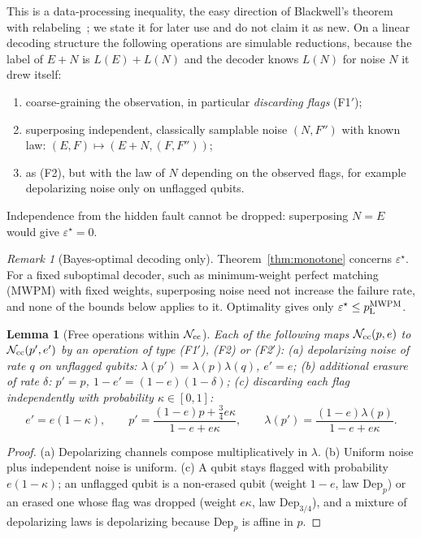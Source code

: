 \documentclass[11pt,a4paper]{article}
\theoremstyle{plain}
\newtheorem{lemma}[theorem]{Lemma}
\theoremstyle{definition}
\theoremstyle{remark}
\newtheorem{remark}[theorem]{Remark}
\newcommand{\err}{\varepsilon^{\star}}
\newcommand{\pL}{p_{\mathrm{L}}}
\newcommand{\Dep}{\mathrm{Dep}}
\newcommand{\Ncc}{\mathcal{N}_{\rm cc}}
\begin{document}
\noindent This is a data-processing inequality, the easy direction of Blackwell's theorem with relabeling~\cite{Blackwell}; we state it for later use and do not claim it as new. On a linear decoding structure the following operations are simulable reductions, because the label of $E+N$ is $L(E)+L(N)$ and the decoder knows $L(N)$ for noise $N$ it drew itself:
\begin{enumerate}[label=(F\arabic*),leftmargin=3em]
\item[(F1)] coarse-graining the observation, in particular \emph{discarding flags} (F1$'$);
\item[(F2)] superposing independent, classically samplable noise $(N,F'')$ with known law: $(E,F)\mapsto(E+N,(F,F''))$;
\item[(F2$'$)] as (F2), but with the law of $N$ depending on the observed flags, for example depolarizing noise only on unflagged qubits.
\end{enumerate}
Independence from the hidden fault cannot be dropped: superposing $N=E$ would give $\err=0$.

\begin{remark}[Bayes-optimal decoding only]\label{rem:ml-only}
Theorem~\ref{thm:monotone} concerns $\err$. For a fixed suboptimal decoder, such as minimum-weight perfect matching (MWPM) with fixed weights, superposing noise need not increase the failure rate, and none of the bounds below applies to it. Optimality gives only $\err\le\pL^{\rm MWPM}$.
\end{remark}

\begin{lemma}[Free operations within $\Ncc$]\label{lem:basic-ops}
Each of the following maps $\Ncc(p,e)$ to $\Ncc(p',e')$ by an operation of type (F1$'$), (F2) or (F2$'$):
(a) depolarizing noise of rate $q$ on unflagged qubits: $\lambda(p')=\lambda(p)\lambda(q)$, $e'=e$;
(b) additional erasure of rate $\delta$: $p'=p$, $1-e'=(1-e)(1-\delta)$;
(c) discarding each flag independently with probability $\kappa\in[0,1]$:
\[
e'=e(1-\kappa),\qquad p'=\frac{(1-e)p+\tfrac34e\kappa}{1-e+e\kappa},\qquad \lambda(p')=\frac{(1-e)\lambda(p)}{1-e+e\kappa}.
\]
\end{lemma}
\begin{proof}
(a) Depolarizing channels compose multiplicatively in $\lambda$. (b) Uniform noise plus independent noise is uniform. (c) A qubit stays flagged with probability $e(1-\kappa)$; an unflagged qubit is a non-erased qubit (weight $1-e$, law $\Dep_p$) or an erased one whose flag was dropped (weight $e\kappa$, law $\Dep_{3/4}$), and a mixture of depolarizing laws is depolarizing because $\Dep_p$ is affine in $p$.
\end{proof}
\end{document}
